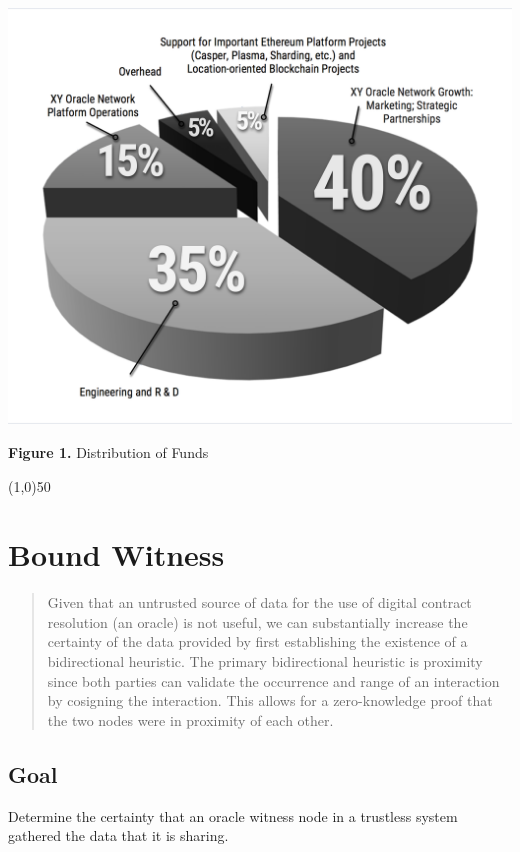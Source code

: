 \documentclass{article}
\begin{document}
\includegraphics[width=\textwidth] {FundAllocationChart}
\begin{center}\textbf{Figure 1.}  Distribution of Funds
\end{center}

\begin{center}
\line(1,0){50}
\end{center}

\section {Bound Witness}
\begin{abstract}
Given that an untrusted source of data for the use of digital contract resolution (an \gls{oracle}) is not useful, we can substantially increase the \gls{certainty} of the data provided by first establishing the existence of a bidirectional \gls{heuristic}. The primary bidirectional heuristic is proximity since both parties can validate the occurrence and range of an interaction by cosigning the interaction. This allows for a zero-knowledge proof that the two nodes were in proximity of each other.
\end{abstract}

\subsection {Goal}
Determine the \gls{certainty} that an \gls{oracle} witness node in a trustless system gathered the data that it is sharing.
\end{document}

